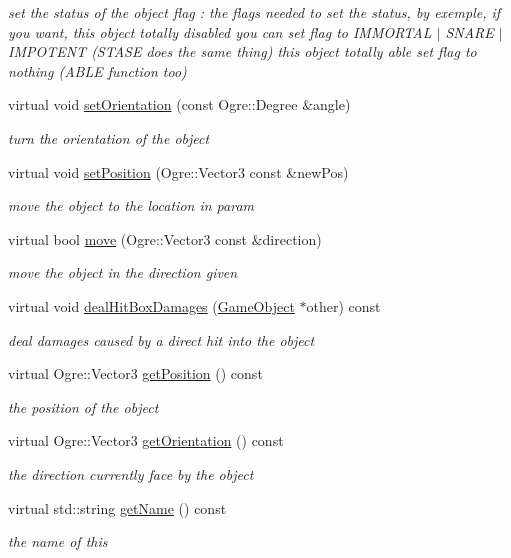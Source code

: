 \begin{DoxyCompactItemize}
\begin{DoxyCompactList}\small\item\em set the status of the object  flag \+: the flags needed to set the status, by exemple, if you want, this object totally disabled you can set flag to I\+M\+M\+O\+R\+T\+AL $\vert$ S\+N\+A\+RE $\vert$ I\+M\+P\+O\+T\+E\+NT (S\+T\+A\+SE does the same thing) this object totally able set flag to nothing (A\+B\+LE function too) \end{DoxyCompactList}\item 
virtual void \hyperlink{class_game_object_aa899aff160cc171e64b5dd2303f61e36}{set\+Orientation} (const Ogre\+::\+Degree \&angle)
\begin{DoxyCompactList}\small\item\em turn the orientation of the object \end{DoxyCompactList}\item 
virtual void \hyperlink{class_game_object_a479654b0ea6a1684c5cbce4fe428a01f}{set\+Position} (Ogre\+::\+Vector3 const \&new\+Pos)
\begin{DoxyCompactList}\small\item\em move the object to the location in param \end{DoxyCompactList}\item 
virtual bool \hyperlink{class_game_object_a833fa8ddc445b89a53e40758657401d1}{move} (Ogre\+::\+Vector3 const \&direction)
\begin{DoxyCompactList}\small\item\em move the object in the direction given \end{DoxyCompactList}\item 
virtual void \hyperlink{class_game_object_a581ad28a8c957c57adbf24752d9378a4}{deal\+Hit\+Box\+Damages} (\hyperlink{class_game_object}{Game\+Object} $\ast$other) const 
\begin{DoxyCompactList}\small\item\em deal damages caused by a direct hit into the object \end{DoxyCompactList}\item 
virtual Ogre\+::\+Vector3 \hyperlink{class_game_object_a5f3e43daa1e8940e416ea8090184e0f4}{get\+Position} () const 
\begin{DoxyCompactList}\small\item\em the position of the object \end{DoxyCompactList}\item 
virtual Ogre\+::\+Vector3 \hyperlink{class_game_object_ade59f3f24a242181ca8d1d157cf25252}{get\+Orientation} () const 
\begin{DoxyCompactList}\small\item\em the direction currently face by the object \end{DoxyCompactList}\item 
virtual std\+::string \hyperlink{class_game_object_a56931178619b28a3e29a18dc631dee4d}{get\+Name} () const 
\begin{DoxyCompactList}\small\item\em the name of this \end{DoxyCompactList}\end{DoxyCompactItemize}
